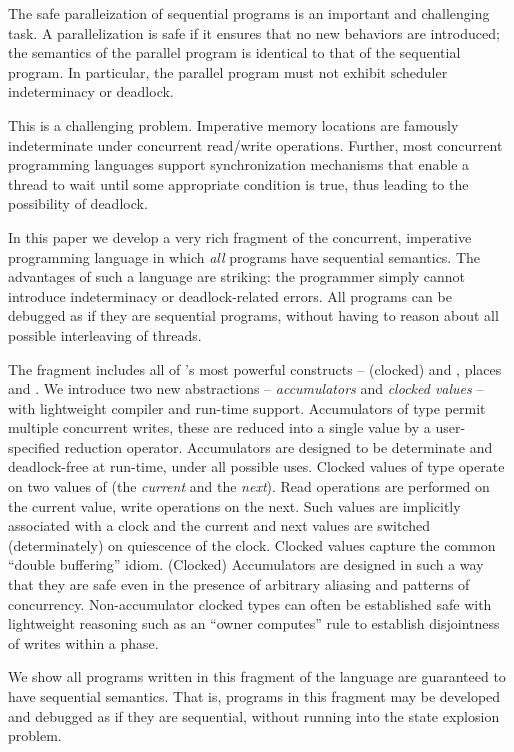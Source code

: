 
The safe paralleization of sequential programs is an important and
challenging task. A parallelization is safe if it ensures that no new
behaviors are introduced; the semantics of the parallel program is
identical to that of the sequential program. In particular, the
parallel program must not exhibit scheduler indeterminacy or deadlock.

This is a challenging problem.  Imperative memory locations are
famously indeterminate under concurrent read/write
operations. Further, most concurrent programming languages support
synchronization mechanisms that enable a thread to wait until some
appropriate condition is true, thus leading to the possibility of
deadlock.

In this paper we develop a very rich fragment of the concurrent,
imperative programming language \Xten{} in which {\em all} programs
have sequential semantics. The advantages of such a language are
striking: the programmer simply cannot introduce indeterminacy or
deadlock-related errors. All programs can be debugged as if they are
sequential programs, without having to reason about all possible
interleaving of threads.

The fragment includes all of \Xten{}'s most powerful constructs --
(clocked)  and , places and {}. We
introduce two new abstractions -- {\em accumulators} and {\em clocked
  values} -- with lightweight compiler and run-time
support. Accumulators of type  permit multiple concurrent
writes, these are reduced into a single value by a user-specified
reduction operator. Accumulators are designed to be determinate and
deadlock-free at run-time, under all possible uses.  Clocked values of
type  operate on two values of  (the {\em current} and
the {\em next}). Read operations are performed on the current value,
write operations on the next. Such values are implicitly associated
with a clock and the current and next values are switched
(determinately) on quiescence of the clock. Clocked values capture the
common ``double buffering'' idiom. (Clocked) Accumulators are designed
in such a way that they are safe even in the presence of arbitrary
aliasing and patterns of concurrency. Non-accumulator clocked types
can often be established safe with lightweight reasoning such as an
``owner computes'' rule to establish disjointness of writes within a phase.

We show all programs written in this fragment of the language are
guaranteed to have sequential semantics. That is, programs in this
fragment may be developed and debugged as if they are sequential,
without running into the state explosion problem.

